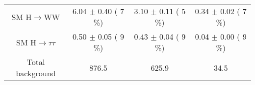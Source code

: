 \begin{table}[h!]
\begin{center}
{\begin{tabular}{c c c c }
 SM H$\to$WW           &      6.04 $\pm$       0.40 (         7 \%)              &       3.10 $\pm$       0.11 (         5 \%)             &      0.34 $\pm$       0.02 (        7 \%)               \\
 
 SM H$\to\tau\tau$                &      0.50 $\pm$       0.05 (         9 \%)              &       0.43 $\pm$       0.04 (         9 \%)             &      0.04 $\pm$       0.00 (         9 \%)               \\
      
\midrule
    Total background          &    876.5               &     625.9           &     34.5          \\
\bottomrule
\end{tabular}
}
\end{center}
\end{table}

